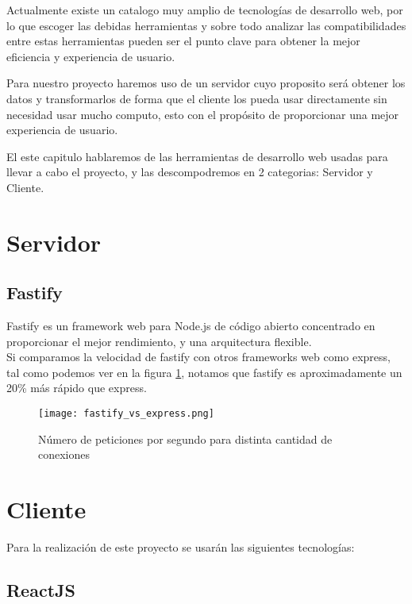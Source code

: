 Actualmente existe un catalogo muy amplio de tecnologías de desarrollo web, por lo que escoger las debidas herramientas y sobre todo analizar las compatibilidades entre estas herramientas pueden ser el punto clave para obtener la mejor eficiencia y experiencia de usuario. 

Para nuestro proyecto haremos uso de un servidor cuyo proposito será obtener los datos y transformarlos de forma que el cliente los pueda usar directamente sin necesidad usar mucho computo, esto con el propósito de proporcionar una mejor experiencia de usuario.

El este capitulo hablaremos de las herramientas de desarrollo web usadas para llevar a cabo el proyecto, y las descompodremos en 2 categorias: Servidor y Cliente.

\section{Servidor}

    \subsection{Fastify}

    Fastify es un framework web para Node.js de código abierto concentrado en proporcionar el mejor rendimiento, y una arquitectura flexible. \\

    Si comparamos la velocidad de fastify con otros frameworks web como express, tal como podemos ver en la figura \ref{fig:fastify_vs_express}, notamos que fastify es aproximadamente un 20\% más rápido que express. \\

    \begin{figure}
        \texttt{[image: fastify\_vs\_express.png]}
        \caption{ Número de peticiones por segundo para distinta cantidad de conexiones}
        \label{fig:fastify_vs_express}
    \end{figure}


\section{Cliente}

    Para la realización de este proyecto se usarán las siguientes tecnologías:

    \subsection{ReactJS}

